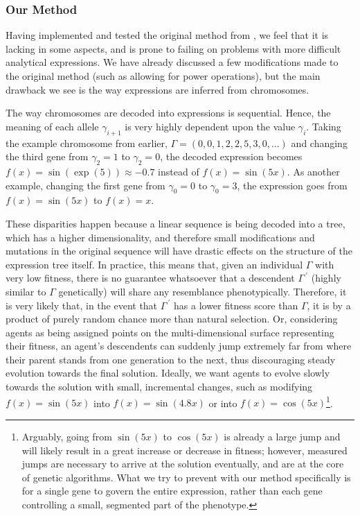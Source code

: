 \documentclass[aps,reprint,superscriptaddress,nofootinbib]{revtex4-2}
\begin{document}
\subsubsection{Our Method}

Having implemented and tested the original method from \cite{solving_diff_reproduce}, we feel that it is lacking in some aspects, and is prone to failing on problems with more difficult analytical expressions. We have already discussed a few modifications made to the original method (such as allowing for power operations), but the main drawback we see is the way expressions are inferred from chromosomes.

The way chromosomes are decoded into expressions is sequential. Hence, the meaning of each allele \(\gamma_{i+1}\) is very highly dependent upon the value \(\gamma_{i}\). Taking the example chromosome from earlier, \(\Gamma = \left(0, 0, 1, 2, 2, 5, 3, 0, \ldots\right)\) and changing the third gene from \(\gamma_2 = 1\) to \(\gamma_2 = 0\), the decoded expression becomes \(f(x) = \sin(\exp(5)) \approx -0.7\) instead of \(f(x) = \sin(5x)\). As another example, changing the first gene from \(\gamma_0 = 0\) to \(\gamma_0 = 3\), the expression goes from \(f(x) = \sin(5x)\) to \(f(x) = x\).

These disparities happen because a linear sequence is being decoded into a tree, which has a higher dimensionality, and therefore small modifications and mutations in the original sequence will have drastic effects on the structure of the expression tree itself. In practice, this means that, given an individual \(\Gamma\) with very low fitness, there is no guarantee whatsoever that a descendent \(\Gamma^{~\prime}\) (highly similar to \(\Gamma\) genetically) will share any resemblance phenotypically. Therefore, it is very likely that, in the event that \(\Gamma^{~\prime}\) has a lower fitness score than \(\Gamma\), it is by a product of purely random chance more than natural selection. Or, considering agents as being assigned points on the multi-dimensional surface representing their fitness, an agent's descendents can suddenly jump extremely far from where their parent stands from one generation to the next, thus discouraging steady evolution towards the final solution. Ideally, we want agents to evolve slowly towards the solution with small, incremental changes, such as modifying \(f(x) = \sin(5x)\) into \(f(x) = \sin(4.8x)\) or into \(f(x) = \cos(5x)\)\footnote{Arguably, going from \(\sin(5x)\) to \(\cos(5x)\) is already a large jump and will likely result in a great increase or decrease in fitness; however, measured jumps are necessary to arrive at the solution eventually, and are at the core of genetic algorithms. What we try to prevent with our method specifically is for a single gene to govern the entire expression, rather than each gene controlling a small, segmented part of the phenotype.}.
\end{document}
